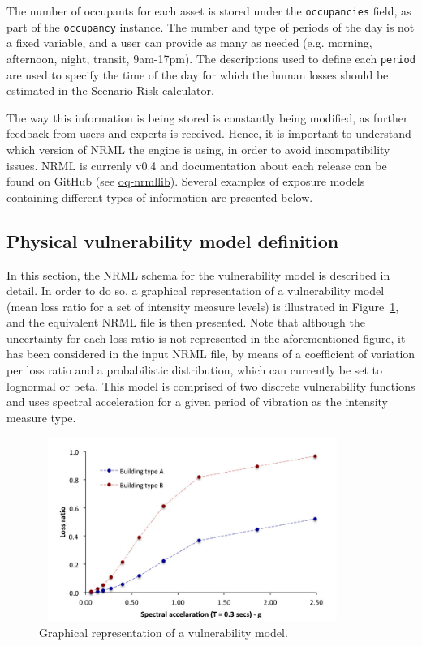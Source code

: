 The number of occupants for each asset is stored under the \Verb+occupancies+ field, as part of the \Verb+occupancy+ instance. The number and type of periods of the day is not a fixed variable, and a user can provide as many as needed (e.g. morning, afternoon, night, transit, 9am-17pm). The descriptions used to define each \Verb+period+ are used to specify the time of the day for which the human losses should be estimated in the Scenario Risk calculator.

The way this information is being stored is constantly being modified, as further feedback from users and experts is received. Hence, it is important to understand which version of NRML the engine is using, in order to avoid incompatibility issues. NRML is currenly v0.4 and documentation about each release can be found on GitHub (see \href{http://gitub.com/gem/oq-nrmllib}{oq-nrmllib}). Several examples of \glspl{exposure model} containing different types of information are presented below.

\subsection{Physical vulnerability model definition}
In this section, the NRML schema for the \gls{vulnerability model} is described in detail. In order to do so, a graphical representation of a \gls{vulnerability model} (mean loss ratio for a set of intensity measure levels) is illustrated in Figure~\ref{fig:vulModel}, and the equivalent NRML file is then presented. Note that although the uncertainty for each loss ratio is not represented in the aforementioned figure, it has been considered in the input NRML file, by means of a coefficient of variation per loss ratio and a probabilistic distribution, which can currently be set to lognormal or beta. This model is comprised of two discrete \glspl{vulnerability function} and uses spectral acceleration for a given period of vibration as the intensity measure type.

\begin{figure}[ht]
\centering
\includegraphics[width=10cm,height=6cm]{figures/risk/vulnerabilityModel.pdf}
\caption{Graphical representation of a vulnerability model.}
\label{fig:vulModel}
\end{figure}

